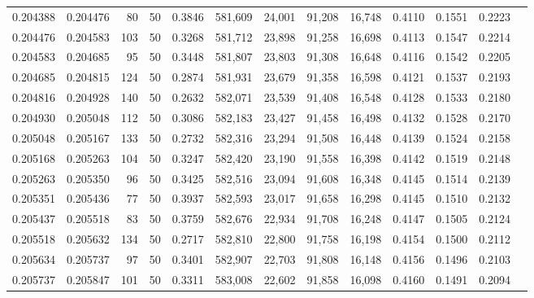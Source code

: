 \begin{tabular}{rrrrrrrrrrrrr}
0.204388 & 0.204476 &    80 &  50 &                                     0.3846 & 581,609 &  24,001 &  91,208 &  16,748 & 0.4110 & 0.1551 & 0.2223 \\
0.204476 & 0.204583 &   103 &  50 &                                     0.3268 & 581,712 &  23,898 &  91,258 &  16,698 & 0.4113 & 0.1547 & 0.2214 \\
0.204583 & 0.204685 &    95 &  50 &                                     0.3448 & 581,807 &  23,803 &  91,308 &  16,648 & 0.4116 & 0.1542 & 0.2205 \\
0.204685 & 0.204815 &   124 &  50 &                                     0.2874 & 581,931 &  23,679 &  91,358 &  16,598 & 0.4121 & 0.1537 & 0.2193 \\
0.204816 & 0.204928 &   140 &  50 &                                     0.2632 & 582,071 &  23,539 &  91,408 &  16,548 & 0.4128 & 0.1533 & 0.2180 \\
0.204930 & 0.205048 &   112 &  50 &                                     0.3086 & 582,183 &  23,427 &  91,458 &  16,498 & 0.4132 & 0.1528 & 0.2170 \\
0.205048 & 0.205167 &   133 &  50 &                                     0.2732 & 582,316 &  23,294 &  91,508 &  16,448 & 0.4139 & 0.1524 & 0.2158 \\
0.205168 & 0.205263 &   104 &  50 &                                     0.3247 & 582,420 &  23,190 &  91,558 &  16,398 & 0.4142 & 0.1519 & 0.2148 \\
0.205263 & 0.205350 &    96 &  50 &                                     0.3425 & 582,516 &  23,094 &  91,608 &  16,348 & 0.4145 & 0.1514 & 0.2139 \\
0.205351 & 0.205436 &    77 &  50 &                                     0.3937 & 582,593 &  23,017 &  91,658 &  16,298 & 0.4145 & 0.1510 & 0.2132 \\
0.205437 & 0.205518 &    83 &  50 &                                     0.3759 & 582,676 &  22,934 &  91,708 &  16,248 & 0.4147 & 0.1505 & 0.2124 \\
0.205518 & 0.205632 &   134 &  50 &                                     0.2717 & 582,810 &  22,800 &  91,758 &  16,198 & 0.4154 & 0.1500 & 0.2112 \\
0.205634 & 0.205737 &    97 &  50 &                                     0.3401 & 582,907 &  22,703 &  91,808 &  16,148 & 0.4156 & 0.1496 & 0.2103 \\
0.205737 & 0.205847 &   101 &  50 &                                     0.3311 & 583,008 &  22,602 &  91,858 &  16,098 & 0.4160 & 0.1491 & 0.2094 \\

\end{tabular}
